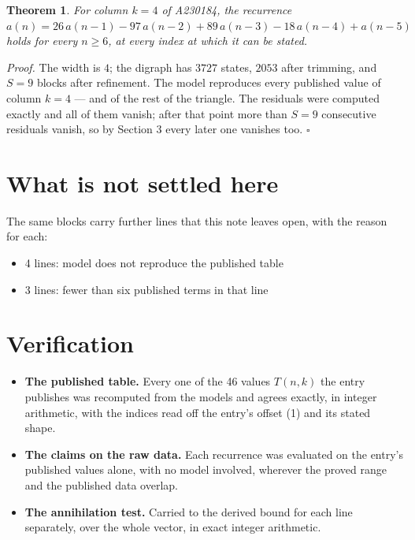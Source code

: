 \documentclass[11pt]{article}
\newtheorem{theorem}{Theorem}
\theoremstyle{definition}
\begin{document}
\begin{theorem} For column $k = 4$ of A230184, the recurrence $a(n) = 26\,a(n-1) - 97\,a(n-2) + 89\,a(n-3) - 18\,a(n-4) + a(n-5)$ holds for every $n \ge 6$, at every index at which it can be stated.\end{theorem}

{\itshape Proof.} The width is $4$; the digraph has $3727$ states, $2053$ after trimming, and $S = 9$ blocks after refinement. The model reproduces every published value of column $k = 4$ --- and of the rest of the triangle. The residuals were computed exactly and all of them vanish; after that point more than $S = 9$ consecutive residuals vanish, so by Section 3 every later one vanishes too. $\square$

\section{What is not settled here}

The same blocks carry further lines that this note leaves open, with the reason for each:

\begin{itemize}

\item 4 lines: model does not reproduce the published table

\item 3 lines: fewer than six published terms in that line

\end{itemize}

\section{Verification}

\begin{itemize}

\item {\bfseries The published table.} Every one of the 46 values $T(n,k)$ the entry publishes was recomputed from the models and agrees exactly, in integer arithmetic, with the indices read off the entry's offset (1) and its stated shape.

\item {\bfseries The claims on the raw data.} Each recurrence was evaluated on the entry's published values alone, with no model involved, wherever the proved range and the published data overlap.

\item {\bfseries The annihilation test.} Carried to the derived bound for each line separately, over the whole vector, in exact integer arithmetic.

\end{itemize}
\end{document}
